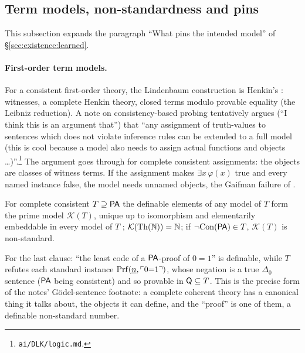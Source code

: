 \subsection{Term models, non-standardness and pins}\label{app:existence:pins}

This subsection expands the paragraph ``What pins the intended model'' of \S\ref{sec:existence:learned}.

\paragraph{First-order term models.} For a consistent first-order theory, the Lindenbaum construction is Henkin's \citep{henkin1949completeness}: witnesses, a complete Henkin theory, closed terms modulo provable equality (the Leibniz reduction). A note on consistency-based probing tentatively argues (``I think this is an argument that'') that ``any assignment of truth-values to sentences which does not violate inference rules can be extended to a full model (this is cool because a model also needs to assign actual functions and objects \dots)''.\footnote{\texttt{ai/DLK/logic.md}.} The argument goes through for complete consistent assignments: the objects are classes of witness terms. If the assignment makes $\exists x\,\varphi(x)$ true and every named instance false, the model needs unnamed objects, the Gaifman failure of .

\begin{theorem}\label{thm:existence:prime}
For complete consistent $T\supseteq\mathsf{PA}$ the definable elements of any model of $T$ form the prime model $\mathcal K(T)$, unique up to isomorphism and elementarily embeddable in every model of $T$ \citep{kaye1991models}; $\mathcal K(\mathrm{Th}(\mathbb{N}))=\mathbb{N}$; if $\neg\mathrm{Con}(\mathsf{PA})\in T$, $\mathcal K(T)$ is non-standard.
\end{theorem}

For the last clause: ``the least code of a $\mathsf{PA}$-proof of $0=1$'' is definable, while $T$ refutes each standard instance $\mathrm{Prf}(\underline{n},\ulcorner0{=}1\urcorner)$, whose negation is a true $\Delta_0$ sentence ($\mathsf{PA}$ being consistent) and so provable in $\mathsf{Q}\subseteq T$. This is the precise form of the notes' G\"odel-sentence footnote: a complete coherent theory has a canonical thing it talks about, the objects it can define, and the ``proof'' is one of them, a definable non-standard number.

